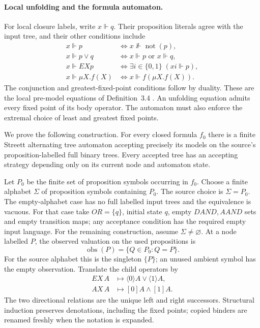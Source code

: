 \paragraph{Local unfolding and the formula automaton.}
\label{sec:p09-emerson-jutla-formula-automaton}
For local closure labels, write \(x\Vdash q\).
Their proposition literals agree with the
input tree, and their other conditions include
\[
\begin{aligned}
 x\Vdash p
 &\Longleftrightarrow x\not\Vdash\operatorname{not}(p),\\
 x\Vdash p\lor q
 &\Longleftrightarrow x\Vdash p\text{ or }x\Vdash q,\\
 x\Vdash EXp
 &\Longleftrightarrow
   \exists i\in\{0,1\}\;(xi\Vdash p),\\
 x\Vdash\mu X.f(X)
 &\Longleftrightarrow x\Vdash f(\mu X.f(X)).
\end{aligned}
\]
The conjunction and greatest-fixed-point
conditions follow by duality.
These are the local pre-model equations
of Definition~3.4
\cite[\S3]{EmersonJutla1991}.
An unfolding equation admits every
fixed point of its body operator.
The automaton must also enforce
the extremal choice of least
and greatest fixed points.

We prove the following construction.
For every closed formula \(f_0\)
there is a finite Streett
alternating tree automaton
accepting precisely its models
on the source's proposition-labelled
full binary trees. Every
accepted tree has an accepting
strategy depending only on
its current node and automaton
state.

Let \(P_0\) be the finite
set of proposition symbols
occurring in \(f_0\).
Choose a finite alphabet
\(\Sigma\) of proposition symbols
containing \(P_0\).
The source choice is
\(\Sigma=P_0\).
The empty-alphabet case
has no full labelled
input trees and the
equivalence is vacuous.
For that case take
\(OR=\{q\}\), initial
state \(q\), empty
\(DAND,AAND\) sets and
empty transition maps;
any acceptance condition
has the required empty
input language.
For the remaining construction,
assume \(\Sigma\ne\varnothing\).
At a node labelled \(P\),
the observed valuation on
the used propositions is
\[
 \operatorname{obs}(P)=\{Q\in P_0:Q=P\}.
\]
For the source alphabet this
is the singleton \(\{P\}\);
an unused ambient symbol
has the empty observation.
Translate the child operators
by
\[
\begin{aligned}
 EX\,A&\longmapsto
          \langle0\rangle A\lor\langle1\rangle A,\\
 AX\,A&\longmapsto
          [0]A\land[1]A.
\end{aligned}
\]
The two directional relations
are the unique left and
right successors. Structural
induction preserves denotations,
including the fixed points;
copied binders are renamed
freshly when the notation
is expanded.

